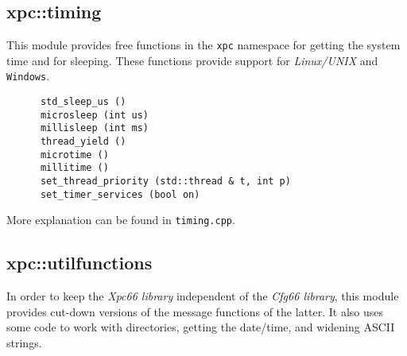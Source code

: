 \subsection{xpc::timing}
\label{subsec:xpc_namespace_timing}

   This module provides free functions in the \texttt{xpc} namespace
   for getting the system time and for sleeping.
   These functions provide support for
   \textsl{Linux/UNIX} and \texttt{Windows}.

   \begin{verbatim}
      std_sleep_us ()
      microsleep (int us)
      millisleep (int ms)
      thread_yield ()
      microtime ()
      millitime ()
      set_thread_priority (std::thread & t, int p)
      set_timer_services (bool on)
   \end{verbatim}

   More explanation can be found in \texttt{timing.cpp}.

\subsection{xpc::utilfunctions}
\label{subsec:xpc_namespace_utilfunctions}

   In order to keep the \textsl{Xpc66 library} independent
   of the \textsl{Cfg66 library}, this module
   provides cut-down versions of the message functions of
   the latter.
   It also uses some code to work with directories,
   getting the date/time, and widening ASCII strings.

